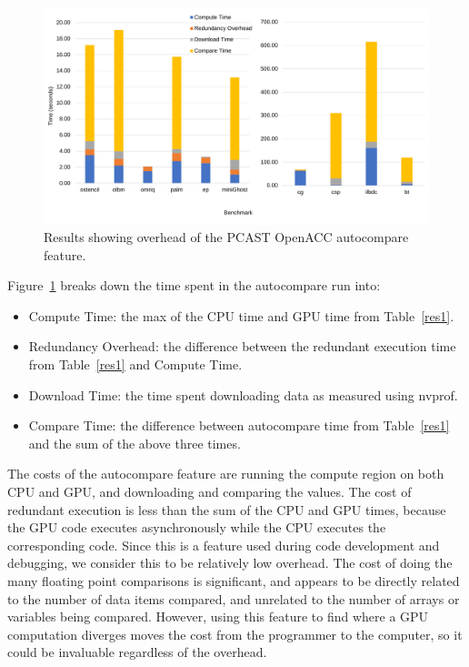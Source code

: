 
\begin{figure}
    \centering
    \includegraphics [width=1\linewidth] {npic3.pdf}
    \caption{Results showing overhead of the PCAST OpenACC autocompare feature.}
    \label{fig:sle_figure}
\end{figure}


Figure~\ref{fig:sle_figure} breaks down the time spent in the autocompare run into:
\begin{itemize}
\item Compute Time: the max of the CPU time and GPU time from Table~\ref{res1}.
\item Redundancy Overhead: the difference between the redundant execution time from Table~\ref{res1} and Compute Time.
\item Download Time: the time spent downloading data as measured using nvprof.
\item Compare Time: the difference between autocompare time from Table~\ref{res1} and the sum of the above three times.
\end{itemize}



The costs of the autocompare feature are running the compute region on both CPU and GPU, and downloading and comparing the values.
The cost of redundant execution is less than the sum of the CPU and GPU times, because the GPU code executes asynchronously while the CPU executes the corresponding code.
Since this is a feature used during code development and debugging, we consider this to be relatively low overhead.
The cost of doing the many floating point comparisons is significant, and appears to be directly related to the number of data items compared, and unrelated to the number of arrays or variables being compared.
However, using this feature to find where a GPU computation diverges moves the cost from the programmer to the computer, so it could be invaluable regardless of the overhead. 



